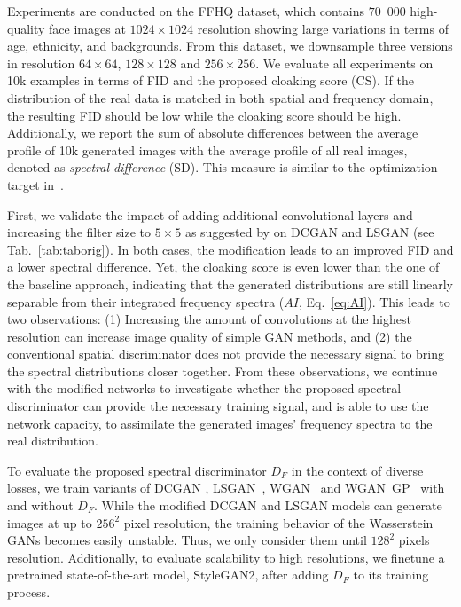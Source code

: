 \documentclass[letterpaper]{article} %
\begin{document}

Experiments are conducted on the FFHQ dataset, which contains $70$~$000$ high-quality face images at $1024 \times 1024$ resolution showing large variations in terms of age, ethnicity, and backgrounds.
From this dataset, we downsample three versions in resolution $64\times64$, $128\times128$ and $256\times256$.
We evaluate all experiments on 10k examples in terms of FID and the proposed cloaking score (CS). If the distribution of the real data is matched in both spatial and frequency domain, the resulting FID should be low while the cloaking score should be high. Additionally, we report the sum of absolute differences between the average profile of 10k generated images with the average profile of all real images, denoted as \textit{spectral difference} (SD).
This measure is similar to the optimization target in~\cite{margret2020upconvolution}.

First, we validate the impact of adding additional convolutional layers and increasing the filter size to $5\times5$ as suggested by \citet{margret2020upconvolution} on DCGAN and LSGAN (see Tab.~\ref{tab:taborig}).
In both cases, the modification leads to an improved FID and a lower spectral difference. Yet, the cloaking score is even lower than the one of the baseline approach, indicating that the generated distributions are still linearly separable from their integrated frequency spectra ($AI$, Eq.~\eqref{eq:AI}). This leads to two observations: (1) Increasing the amount of convolutions at the highest resolution can increase image quality of simple GAN methods, and (2) the conventional spatial discriminator does not provide the necessary signal to bring the spectral distributions closer together.
From these observations, we continue with the modified networks to investigate whether the proposed spectral discriminator can provide the necessary training signal, and is able to use the network capacity, to assimilate the generated images' frequency spectra to the real distribution.

To evaluate the proposed spectral discriminator $D_F$ in the context of diverse losses, we train variants of \mbox{DCGAN} \cite{radford2015dcgan}, LSGAN~\cite{mao2017least}, WGAN~\cite{arjovsky2017wasserstein} and WGAN~GP~\cite{gulrajani2017improved} with and without $D_F$.
%
 While the modified DCGAN and LSGAN models can generate images at up to $256^2$ pixel resolution, the training behavior of the Wasserstein GANs becomes easily unstable. Thus, we only consider them until $128^2$ pixels resolution.
Additionally, to evaluate scalability to high resolutions, we finetune a pretrained state-of-the-art model, StyleGAN2, after adding $D_F$ to its training process.
\end{document}
